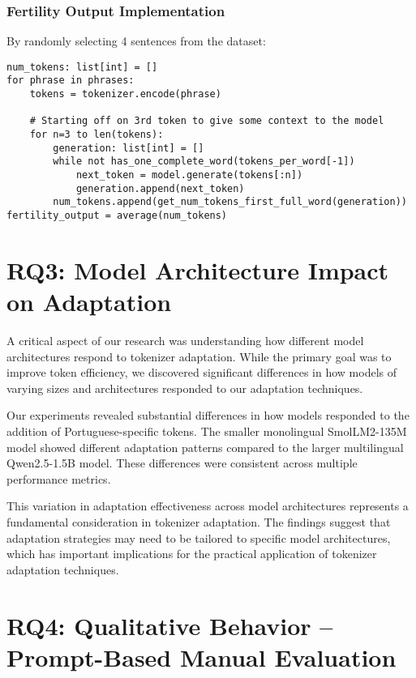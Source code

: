 \subsubsection{Fertility Output Implementation}
By randomly selecting 4 sentences from the \cite{calamept_reference} dataset:
\begin{lstlisting}
num_tokens: list[int] = []
for phrase in phrases:
    tokens = tokenizer.encode(phrase)
    
    # Starting off on 3rd token to give some context to the model
    for n=3 to len(tokens):
        generation: list[int] = []
        while not has_one_complete_word(tokens_per_word[-1])
            next_token = model.generate(tokens[:n])
            generation.append(next_token)
        num_tokens.append(get_num_tokens_first_full_word(generation))
fertility_output = average(num_tokens)
\end{lstlisting}

\section{RQ3: Model Architecture Impact on Adaptation}
\label{sec:model_impact}

A critical aspect of our research was understanding how different model architectures respond to tokenizer adaptation. While the primary goal was to improve token efficiency, we discovered significant differences in how models of varying sizes and architectures responded to our adaptation techniques.


Our experiments revealed substantial differences in how models responded to the addition of Portuguese-specific tokens. The smaller monolingual SmolLM2-135M model showed different adaptation patterns compared to the larger multilingual Qwen2.5-1.5B model. These differences were consistent across multiple performance metrics.

This variation in adaptation effectiveness across model architectures represents a fundamental consideration in tokenizer adaptation. The findings suggest that adaptation strategies may need to be tailored to specific model architectures, which has important implications for the practical application of tokenizer adaptation techniques.

\section{RQ4: Qualitative Behavior – Prompt-Based Manual Evaluation}
\label{sec:manual_eval}


